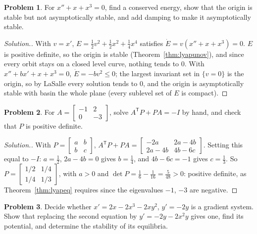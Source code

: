 \documentclass[11pt,a4paper]{article}
\numberwithin{equation}{section}
\theoremstyle{definition}
\newtheorem{problemx}{Problem}[subsection]
\newenvironment{problem}{\begin{problemx}}{\end{problemx}}
\newenvironment{solution}
  {\renewcommand{\qedsymbol}{}\begin{proof}[\textit{Solution}.]}
  {\end{proof}}
\begin{document}
\begin{problem}
For $x'' + x + x^3 = 0$, find a conserved energy, show that the origin is stable but not asymptotically stable, and add damping to make it asymptotically stable.
\end{problem}

\begin{solution}
With $v = x'$, $E = \frac12v^2 + \frac12x^2 + \frac14x^4$ satisfies $\dot E = v(x'' + x + x^3) = 0$. $E$ is positive definite, so the origin is stable (Theorem~\ref{thm:lyapunov}), and since every orbit stays on a closed level
curve, nothing tends to $0$. With $x'' + bx' + x + x^3 = 0$, $\dot E = -bv^2 \leq 0$; the largest invariant set in $\{v = 0\}$ is the origin, so by LaSalle every solution tends to $0$, and the origin is asymptotically
stable with basin the whole plane (every sublevel set of $E$ is compact).
\end{solution}

\begin{problem}
For $A = \begin{bmatrix} -1 & 2\\ 0 & -3\end{bmatrix}$, solve $A^{\mathsf T}P + PA = -I$ by hand, and check that $P$ is positive definite.
\end{problem}

\begin{solution}
With $P = \begin{bmatrix} a & b\\ b & c\end{bmatrix}$, $A^{\mathsf T}P + PA = \begin{bmatrix} -2a & 2a - 4b\\ 2a - 4b & 4b - 6c\end{bmatrix}$. Setting this equal to $-I$: $a = \frac12$, $2a - 4b = 0$ gives $b = \frac14$, and $4b - 6c = -1$ gives $c = \frac13$. So
$P = \begin{bmatrix} 1/2 & 1/4\\ 1/4 & 1/3\end{bmatrix}$, with $a > 0$ and $\det P = \frac16 - \frac1{16} = \frac5{48} > 0$: positive definite, as Theorem~\ref{thm:lyapeq} requires since the eigenvalues $-1$, $-3$ are negative.
\end{solution}

\begin{problem}
Decide whether $x' = 2x - 2x^3 - 2xy^2$, $y' = -2y$ is a gradient system. Show that replacing the second equation by $y' = -2y - 2x^2y$ gives one, find its potential, and determine the stability
of its equilibria.
\end{problem}
\end{document}
